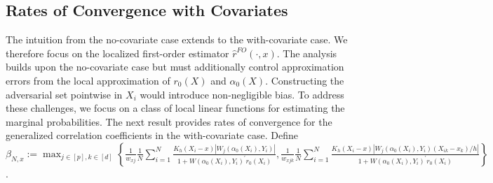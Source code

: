 \documentclass[11pt]{article}
\begin{document}
\subsection{Rates of Convergence with Covariates}\label{Sec:Rates:covariates}
The intuition from the no-covariate case extends to the with-covariate case. We therefore focus on the localized first-order estimator $\hat{r}^{FO}(\cdot,x)$. The analysis builds upon the no-covariate case but must additionally control approximation errors from the local approximation of $r_0(X)$ and $\alpha_0(X)$. Constructing the adversarial set pointwise in $X_i$ would introduce non-negligible bias. To address these challenges, we focus on a class of local linear functions for estimating the marginal probabilities. The next result provides rates of convergence for the generalized correlation coefficients in the with-covariate case. Define $\beta_{N,x}:={\displaystyle\max_{j\in[p],k\in[d]}}\left\{\frac{1}{w_{xj}}\frac{1}{N}\sum_{i=1}^N\frac{K_h(X_i-x)|W_j(\alpha_0(X_i),Y_i)|}{1+W(\alpha_0(X_i),Y_i)^\prime r_0(X_i)},\frac{1}{w_{xjk}}\frac{1}{N}\sum_{i=1}^N\frac{K_h(X_i-x)|W_j(\alpha_0(X_i),Y_i)(X_{ik}-x_k)/h|}{1+W(\alpha_0(X_i),Y_i)^\prime r_0(X_i)}\right\}$.
\end{document}
